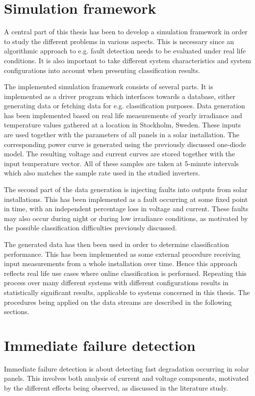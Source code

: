 \section{Simulation framework}
A central part of this thesis has been to develop a simulation framework in order to study the different problems in various aspects.
This is necessary since an algorithmic approach to e.g. fault detection needs to be evaluated under real life conditions.
It is also important to take different system characteristics and system configurations into account when presenting classification results.

The implemented simulation framework consists of several parts.
It is implemented as a driver program which interfaces towards a database, either generating data or fetching data for e.g. classification purposes.
Data generation has been implemented based on real life measurements of yearly irradiance and temperature values gathered at a location in Stockholm, Sweden.
These inputs are used together with the parameters of all panels in a solar installation.
The corresponding power curve is generated using the previously discussed one-diode model.
The resulting voltage and current curves are stored together with the input temperature vector.
All of these samples are taken at 5-minute intervals which also matches the sample rate used in the studied inverters.

The second part of the data generation is injecting faults into outputs from solar installations.
This has been implemented as a fault occurring at some fixed point in time, with an independent percentage loss in voltage and current.
These faults may also occur during night or during low irradiance conditions, as motivated by the possible classification difficulties previously discussed.

The generated data has then been used in order to determine classification performance.
This has been implemented as some external procedure receiving input measurements from a whole installation over time.
Hence this approach reflects real life use cases where online classification is performed.
Repeating this process over many different systems with different configurations results in statistically significant results, applicable to systems concerned in this thesis.
The procedures being applied on the data streams are described in the following sections.

\section{Immediate failure detection}
Immediate failure detection is about detecting fast degradation occurring in solar panels.
This involves both analysis of current and voltage components, motivated by the different effects being observed, as discussed in the literature study.

